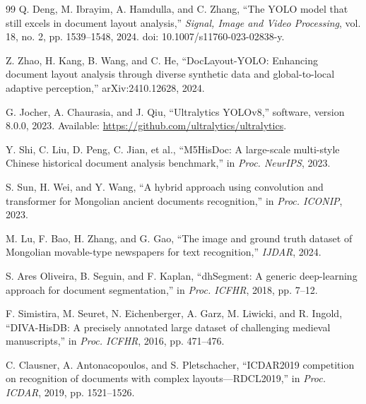 \documentclass[12pt]{article}
\begin{document}
\begin{thebibliography}{99}
Q. Deng, M. Ibrayim, A. Hamdulla, and C. Zhang, ``The YOLO model that still excels in document layout analysis,'' \emph{Signal, Image and Video Processing}, vol. 18, no. 2, pp. 1539--1548, 2024. doi: 10.1007/s11760-023-02838-y.

Z. Zhao, H. Kang, B. Wang, and C. He, ``DocLayout-YOLO: Enhancing document layout analysis through diverse synthetic data and global-to-local adaptive perception,'' arXiv:2410.12628, 2024.

G. Jocher, A. Chaurasia, and J. Qiu, ``Ultralytics YOLOv8,'' software, version 8.0.0, 2023. Available: \url{https://github.com/ultralytics/ultralytics}.

Y. Shi, C. Liu, D. Peng, C. Jian, et al., ``M5HisDoc: A large-scale multi-style Chinese historical document analysis benchmark,'' in \emph{Proc. NeurIPS}, 2023.

S. Sun, H. Wei, and Y. Wang, ``A hybrid approach using convolution and transformer for Mongolian ancient documents recognition,'' in \emph{Proc. ICONIP}, 2023.

M. Lu, F. Bao, H. Zhang, and G. Gao, ``The image and ground truth dataset of Mongolian movable-type newspapers for text recognition,'' \emph{IJDAR}, 2024.

S. Ares Oliveira, B. Seguin, and F. Kaplan, ``dhSegment: A generic deep-learning approach for document segmentation,'' in \emph{Proc. ICFHR}, 2018, pp. 7--12.

F. Simistira, M. Seuret, N. Eichenberger, A. Garz, M. Liwicki, and R. Ingold, ``DIVA-HisDB: A precisely annotated large dataset of challenging medieval manuscripts,'' in \emph{Proc. ICFHR}, 2016, pp. 471--476.

C. Clausner, A. Antonacopoulos, and S. Pletschacher, ``ICDAR2019 competition on recognition of documents with complex layouts---RDCL2019,'' in \emph{Proc. ICDAR}, 2019, pp. 1521--1526.

\end{thebibliography}
\end{document}
